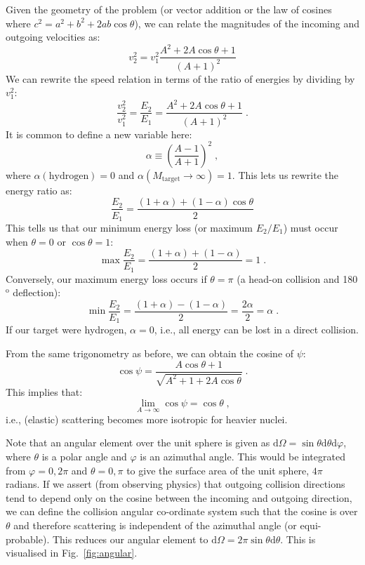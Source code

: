 Given the geometry of the problem (or vector addition or the law of cosines where $c^2 = a^2 + b^2 + 2ab\cos\theta$), we can relate the magnitudes of the incoming and outgoing velocities as:
\begin{equation*}
    v^2_2 = v^2_1 \frac{A^2 + 2A\cos\theta + 1}{(A+1)^2}
\end{equation*}
We can rewrite the speed relation in terms of the ratio of energies by dividing by $v^2_1$:\begin{equation*}
    \frac{v^2_2}{v^2_1} = \frac{E_2}{E_1} = \frac{A^2 + 2A\cos\theta + 1}{(A+1)^2}\;\mathrm{.}
\end{equation*}
It is common to define a new variable here:
\begin{equation*}
    \alpha \equiv \left(\frac{A-1}{A+1}\right)^2\;\mathrm{,}
\end{equation*}
where $\alpha(\mathrm{hydrogen}) = 0$ and $\alpha(M_\mathrm{target}\rightarrow\infty) = 1$. This lets us rewrite the energy ratio as:
\begin{equation}\label{eq:slowdown}
    \frac{E_2}{E_1} = \frac{(1 + \alpha) + (1-\alpha)\cos\theta}{2}
\end{equation}
This tells us that our minimum energy loss (or maximum $E_2/E_1$) must occur when $\theta = 0$ or $\cos\theta = 1$:
\begin{equation*}
    \max \frac{E_2}{E_1} = \frac{(1+\alpha) + (1-\alpha)}{2} = 1\;\mathrm{.}
\end{equation*}
Conversely, our maximum energy loss occurs if $\theta = \pi$ (a head-on collision and 180$^\mathrm{o}$ deflection):
\begin{equation*}
    \min \frac{E_2}{E_1} = \frac{(1+\alpha) - (1-\alpha)}{2} = \frac{2\alpha}{2} = \alpha\;\mathrm{.}
\end{equation*}
If our target were hydrogen, $\alpha = 0$, i.e., all energy can be lost in a direct collision.

From the same trigonometry as before, we can obtain the cosine of $\psi$:
\begin{equation*}
    \cos\psi = \frac{A\cos\theta + 1}{\sqrt{A^2 + 1 + 2A\cos\theta}}\;\mathrm{.}
\end{equation*}
This implies that:
\begin{equation*}
    \lim_{A\rightarrow\infty} \cos\psi = \cos\theta\;\mathrm{,}
\end{equation*}
i.e., (elastic) scattering becomes more isotropic for heavier nuclei.

Note that an angular element over the unit sphere is given as $\mathrm{d}\Omega = \sin\theta\mathrm{d}\theta\mathrm{d}\varphi$, where $\theta$ is a polar angle and $\varphi$ is an azimuthal angle. This would be integrated from $\varphi = 0, 2\pi$ and $\theta = 0,\pi$ to give the surface area of the unit sphere, $4\pi$ radians. If we assert (from observing physics) that outgoing collision directions tend to depend only on the cosine between the incoming and outgoing direction, we can define the collision angular co-ordinate system such that the cosine is over $\theta$ and therefore scattering is independent of the azimuthal angle (or equi-probable). This reduces our angular element to $\mathrm{d}\Omega = 2\pi\sin\theta \mathrm{d}\theta$. This is visualised in Fig.~\ref{fig:angular}.

